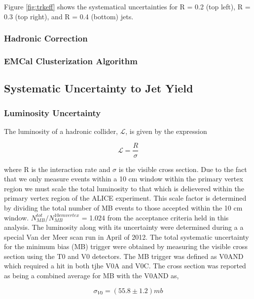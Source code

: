 \noindent
Figure \ref{fig:trkeff} shows the systematical uncertainties for R = 0.2 (top left), R = 0.3 (top right), and R = 0.4 (bottom) jets.   

\subsubsection{Hadronic Correction}

\subsubsection{EMCal Clusterization Algorithm}
\subsection{Systematic Uncertainty to Jet Yield}



\subsubsection{Luminosity Uncertainty}

The luminosity of a hadronic collider, $\mathscr{L}$, is given by the expression



\begin{equation}
\mathscr{L} = \frac{R}{\sigma}
\label{eq:xlumdef}
\end{equation}

\noindent
where R is the interaction rate and $\sigma$ is the visible cross section.  Due to the fact that we only measure events within a 10 cm window within the primary vertex region we must scale the total luminosity to that which is delievered within the primary vertex region of the ALICE experiment.  This scale factor is determined by dividing the total number of MB events to those accepted within the 10 cm window.  $N^{tot}_{MB} / N^{10 cm vertex}_{MB}$ = 1.024 from the acceptance criteria held in this analysis.
The luminosity along with its uncertainty were determined during a a special Van der Meer scan run in April of 2012\cite{ALICE-PUBLIC-2017-002}.  The total systematic uncertainty for the minimum bias (MB) trigger were obtained by measuring the visible cross section using the T0 and V0 detectors.  The MB trigger was defined as V0AND which required a hit in both tjhe V0A and V0C.  The cross section was reported as being a combined average for MB with the V0AND as, 

\begin{equation}
\sigma_{V0} = (55.8 \pm 1.2) mb
\label{eq:xlumdef}
\end{equation}

